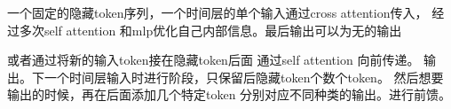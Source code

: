 \documentclass[a4paper, 12pt, UTF8]{ctexart}
\title{}
\author{Yifei He}
\date{\today}
\theoremstyle{theoremstyle}
\theoremstyle{propertystyle}
\theoremstyle{definitionstyle}
\theoremstyle{algorithmstyle}
\begin{document}
\maketitle
一个固定的隐藏token序列，一个时间层的单个输入通过cross attention传入， 经过多次self attention 和mlp优化自己内部信息。最后输出可以为无的输出

或者通过将新的输入token接在隐藏token后面 通过self attention 向前传递。 输出。下一个时间层输入时进行阶段，只保留后隐藏token个数个token。
然后想要输出的时候，再在后面添加几个特定token 分别对应不同种类的输出。进行前馈。



\end{document}

